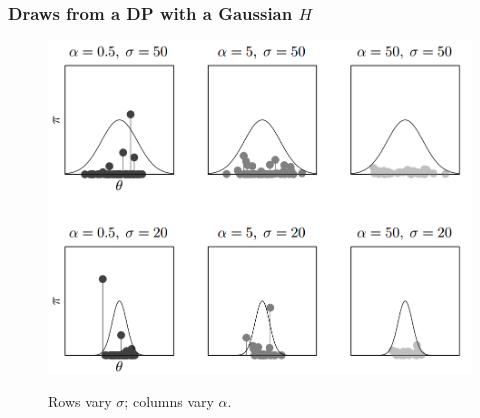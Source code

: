 \documentclass[12pt]{beamer}
\begin{document}
\begin{frame}
    \frametitle{Draws from a DP with a Gaussian $H$}


    \begin{figure}[!h]
        \includegraphics[width=.7\textwidth]{images/gaussian_base_distribution.png}

        Rows vary $\sigma$; columns vary $\alpha$.
    \end{figure}



\end{frame}
\end{document}
